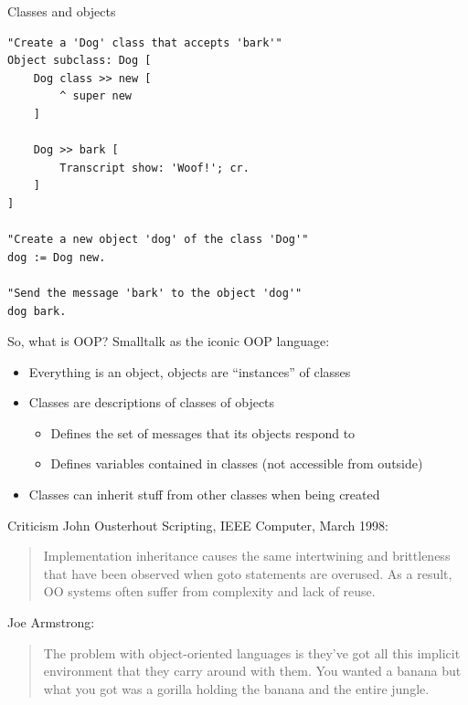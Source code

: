 \documentclass[aspectratio=169]{beamer}
\begin{document}
\begin{frame}[fragile]{Classes and objects}
	\begin{verbatim}
"Create a 'Dog' class that accepts 'bark'"
Object subclass: Dog [
	Dog class >> new [
		^ super new
	]

	Dog >> bark [
		Transcript show: 'Woof!'; cr.
	]
]

"Create a new object 'dog' of the class 'Dog'"
dog := Dog new.

"Send the message 'bark' to the object 'dog'"
dog bark.
	\end{verbatim}
\end{frame}

\begin{frame}{So, what is OOP?}
	Smalltalk as the iconic OOP language:
	\begin{itemize}
		\item Everything is an object, objects are ``instances'' of classes
		\item Classes are descriptions of classes of objects
			\begin{itemize}
				\item Defines the set of messages that its objects respond to
				\item Defines variables contained in classes (not accessible from outside)
			\end{itemize}
		\item Classes can inherit stuff from other classes when being created
	\end{itemize}
\end{frame}

\begin{frame}{Criticism}
	John Ousterhout Scripting, IEEE Computer, March 1998:
	\begin{quote}
		Implementation inheritance causes the same intertwining and brittleness that have been observed when goto statements are overused. As a result, OO systems often suffer from complexity and lack of reuse.
	\end{quote}

	Joe Armstrong:
	\begin{quote}
		The problem with object-oriented languages is they’ve got all this implicit environment that they carry around with them. You wanted a banana but what you got was a gorilla holding the banana and the entire jungle.
	\end{quote}
\end{frame}
\end{document}
